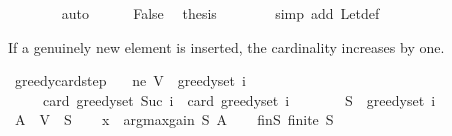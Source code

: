\begin{isabellebody}
\ \ \ \ \ \ \isamarkupfalse%
\ auto\isanewline
\ \ \ \ \isamarkupfalse%
\ False\ \isamarkupfalse%
\ {\isacharquery}{\kern0pt}thesis\isanewline
\ \ \ \ \ \ \isamarkupfalse%
\ {\isacharparenleft}{\kern0pt}simp\ add{\isacharcolon}{\kern0pt}\ Let{\isacharunderscore}{\kern0pt}def{\isacharparenright}{\kern0pt}\isanewline
\ \ \isamarkupfalse%
\isanewline
{}\isamarkupfalse%
%
\endisatagproof
{\isafoldproof}%
%
\isadelimproof
%
\endisadelimproof
%
\begin{isamarkuptext}%
If a genuinely new element is inserted, the cardinality increases by one.%
\end{isamarkuptext}\isamarkuptrue%
\isamarkupfalse%
\ greedy{\isacharunderscore}{\kern0pt}card{\isacharunderscore}{\kern0pt}step{\isacharcolon}{\kern0pt}\isanewline
\ \ \ ne{\isacharcolon}{\kern0pt}\ {\isachardoublequoteopen}V\ {\isacharminus}{\kern0pt}\ greedy{\isacharunderscore}{\kern0pt}set\ i\ {\isasymnoteq}\ {\isacharbraceleft}{\kern0pt}{\isacharbraceright}{\kern0pt}{\isachardoublequoteclose}\isanewline
\ \ \ \ \ {\isachardoublequoteopen}card\ {\isacharparenleft}{\kern0pt}greedy{\isacharunderscore}{\kern0pt}set\ {\isacharparenleft}{\kern0pt}Suc\ i{\isacharparenright}{\kern0pt}{\isacharparenright}{\kern0pt}\ {\isacharequal}{\kern0pt}\ card\ {\isacharparenleft}{\kern0pt}greedy{\isacharunderscore}{\kern0pt}set\ i{\isacharparenright}{\kern0pt}\ {\isacharplus}{\kern0pt}\ {}{\isachardoublequoteclose}\isanewline
%
\isadelimproof
%
\endisadelimproof
%
\isatagproof
{}\isamarkupfalse%
\ {\isacharminus}{\kern0pt}\isanewline
\ \ \isamarkupfalse%
\ {\isacharquery}{\kern0pt}S\ {\isacharequal}{\kern0pt}\ {\isachardoublequoteopen}greedy{\isacharunderscore}{\kern0pt}set\ i{\isachardoublequoteclose}\isanewline
\ \ \isamarkupfalse%
\ {\isacharquery}{\kern0pt}A\ {\isacharequal}{\kern0pt}\ {\isachardoublequoteopen}V\ {\isacharminus}{\kern0pt}\ {\isacharquery}{\kern0pt}S{\isachardoublequoteclose}\isanewline
\ \ \isamarkupfalse%
\ {\isacharquery}{\kern0pt}x\ {\isacharequal}{\kern0pt}\ {\isachardoublequoteopen}argmax{\isacharunderscore}{\kern0pt}gain\ {\isacharquery}{\kern0pt}S\ {\isacharquery}{\kern0pt}A{\isachardoublequoteclose}\isanewline
\isanewline
\ \ \isamarkupfalse%
\ finS{\isacharcolon}{\kern0pt}\ {\isachardoublequoteopen}finite\ {\isacharquery}{\kern0pt}S{\isachardoublequoteclose}\isanewline

\end{isabellebody}
